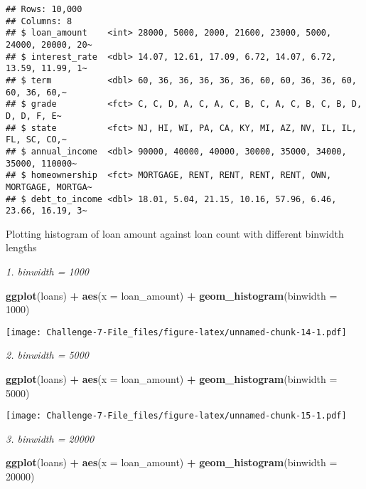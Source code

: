\documentclass[
]{article}
\newenvironment{Shaded}{\begin{snugshade}}{\end{snugshade}}
\newcommand{\AttributeTok}[1]{\textcolor[rgb]{0.13,0.29,0.53}{#1}}
\newcommand{\DecValTok}[1]{\textcolor[rgb]{0.00,0.00,0.81}{#1}}
\newcommand{\FunctionTok}[1]{\textcolor[rgb]{0.13,0.29,0.53}{\textbf{#1}}}
\newcommand{\NormalTok}[1]{#1}
\newcommand{\SpecialCharTok}[1]{\textcolor[rgb]{0.81,0.36,0.00}{\textbf{#1}}}
\begin{document}
\begin{verbatim}
## Rows: 10,000
## Columns: 8
## $ loan_amount    <int> 28000, 5000, 2000, 21600, 23000, 5000, 24000, 20000, 20~
## $ interest_rate  <dbl> 14.07, 12.61, 17.09, 6.72, 14.07, 6.72, 13.59, 11.99, 1~
## $ term           <dbl> 60, 36, 36, 36, 36, 36, 60, 60, 36, 36, 60, 60, 36, 60,~
## $ grade          <fct> C, C, D, A, C, A, C, B, C, A, C, B, C, B, D, D, D, F, E~
## $ state          <fct> NJ, HI, WI, PA, CA, KY, MI, AZ, NV, IL, IL, FL, SC, CO,~
## $ annual_income  <dbl> 90000, 40000, 40000, 30000, 35000, 34000, 35000, 110000~
## $ homeownership  <fct> MORTGAGE, RENT, RENT, RENT, RENT, OWN, MORTGAGE, MORTGA~
## $ debt_to_income <dbl> 18.01, 5.04, 21.15, 10.16, 57.96, 6.46, 23.66, 16.19, 3~
\end{verbatim}

Plotting histogram of loan amount against loan count with different
binwidth lengths

\emph{1. binwidth = 1000}

\begin{Shaded}
\begin{Highlighting}[]
\FunctionTok{ggplot}\NormalTok{(loans) }\SpecialCharTok{+} \FunctionTok{aes}\NormalTok{(}\AttributeTok{x =}\NormalTok{ loan\_amount) }\SpecialCharTok{+}
\FunctionTok{geom\_histogram}\NormalTok{(}\AttributeTok{binwidth =} \DecValTok{1000}\NormalTok{)}
\end{Highlighting}
\end{Shaded}

\texttt{[image: Challenge-7-File\_files/figure-latex/unnamed-chunk-14-1.pdf]}

\emph{2. binwidth = 5000}

\begin{Shaded}
\begin{Highlighting}[]
\FunctionTok{ggplot}\NormalTok{(loans) }\SpecialCharTok{+} \FunctionTok{aes}\NormalTok{(}\AttributeTok{x =}\NormalTok{ loan\_amount) }\SpecialCharTok{+}
\FunctionTok{geom\_histogram}\NormalTok{(}\AttributeTok{binwidth =} \DecValTok{5000}\NormalTok{)}
\end{Highlighting}
\end{Shaded}

\texttt{[image: Challenge-7-File\_files/figure-latex/unnamed-chunk-15-1.pdf]}

\emph{3. binwidth = 20000}

\begin{Shaded}
\begin{Highlighting}[]
\FunctionTok{ggplot}\NormalTok{(loans) }\SpecialCharTok{+} \FunctionTok{aes}\NormalTok{(}\AttributeTok{x =}\NormalTok{ loan\_amount) }\SpecialCharTok{+}
\FunctionTok{geom\_histogram}\NormalTok{(}\AttributeTok{binwidth =} \DecValTok{20000}\NormalTok{)}
\end{Highlighting}
\end{Shaded}
\end{document}
